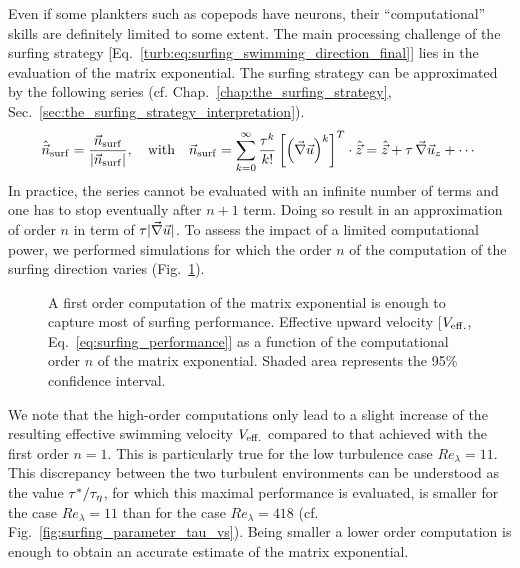 Even if some plankters such as copepods have neurons, their ``computational'' skills are definitely limited to some extent.
The main processing challenge of the surfing strategy [Eq.~\eqref{turb:eq:surfing_swimming_direction_final}] lies in the evaluation of the matrix exponential.
The surfing strategy can be approximated by the following series (cf. Chap.~\ref{chap:the_surfing_strategy}, Sec.~\ref{sec:the_surfing_strategy_interpretation}).
\begin{equation}\label{eq:exp_series}
	\hat{\vec{n}}_{\mathrm{surf}} = \frac{\vec{n}_{\mathrm{surf}}}{\lvert\vec{n}_{\mathrm{surf}}\rvert}, \quad \text{with} \quad 
	\vec{n}_{\mathrm{surf}} = \sum_{k = 0}^{\infty} \frac{\tau^k}{k!} \left[  \left( \vec{\nabla} \vec{u} \right)^k \right]^T \cdot \hat{\vec{z}} = \hat{\vec{z}} + \tau \, \vec{\nabla} \vec{u}_z + \dotsb
\end{equation}
In practice, the series cannot be evaluated with an infinite number of terms and one has to stop eventually after $n+1$ term.
Doing so result in an approximation of order $n$ in term of $\tau \lvert\vec{\nabla} \vec{u}\rvert$.
To assess the impact of a limited computational power, we performed simulations for which the order $n$ of the computation of the surfing direction varies (Fig.~\ref{fig:surfing_exp_order}).
\begin{figure}%
	\centering
	
	\caption[A first order computation of the matrix exponential is enough to capture most of surfing performance.]{
	A first order computation of the matrix exponential is enough to capture most of surfing performance.
	Effective upward velocity [$V_{\mathrm{eff.}}$, Eq.~\eqref{eq:surfing_performance}] as a function of the computational order $n$ of the matrix exponential.
	Shaded area represents the 95\% confidence interval.
	}
	\label{fig:surfing_exp_order}
\end{figure}

We note that the high-order computations only lead to a slight increase of the resulting effective swimming velocity $V_{\mathrm{eff.}}$ compared to that achieved with the first order $n=1$.
This is particularly true for the low turbulence case $\mathit{Re}_{\lambda} = 11$.
This discrepancy between the two turbulent environments can be understood as the value $\tau^* / \tau_{\eta}$, for which this maximal performance is evaluated, is smaller for the case $\mathit{Re}_{\lambda} = 11$ than for the case $\mathit{Re}_{\lambda} = 418$ (cf. Fig.~\ref{fig:surfing_parameter_tau_vs}).
Being smaller a lower order computation is enough to obtain an accurate estimate of the matrix exponential.


